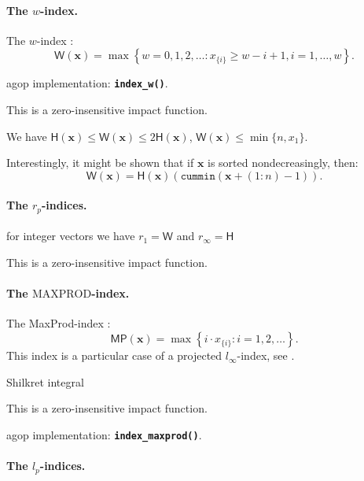 \documentclass[11pt]{article}\usepackage{graphicx, color}
\newcommand{\hlfunctioncall}[1]{\textcolor[rgb]{0.501960784313725,0,0.329411764705882}{\textbf{#1}}}%
\newcommand{\package}[1]{\textsf{#1}\xspace}
\newcommand{\Rfunc}[1]{\texttt{\hlfunctioncall{#1}}}
\newcommand{\vect}[1]{{\mathbf{#1}}}
\newcommand{\func}[1]{{\mathsf{#1}}}
\theoremstyle{remark}
\theoremstyle{definition}
\begin{document}
\paragraph{The $w$-index.}
 The $w$-index \cite{Woeginger2008:axiomatich}:
\begin{equation}\label{Eq:IndexW}
\func{W}(\vect{x}) = \max\left\{w=0,1,2,\ldots: {x}_{\{i\}} \ge w-i+1, i=1,\dots,w\right\}.
\end{equation}

\package{agop} implementation: \Rfunc{index\_w()}.

This is a zero-insensitive impact function.

We have $\func{H}(\vect{x})\le\func{W}(\vect{x})\le 2\func{H}(\vect{x})$,
$\func{W}(\vect{x})\le \min\{n, x_{1}\}$.




Interestingly, it might be shown that if $\vect{x}$ is sorted
nondecreasingly, then:
\[
\func{W}(\vect{x}) = \func{H}(\vect{x})(\mathtt{cummin}(\vect{x}+(1:n)-1)).
\]

\paragraph{The $r_p$-indices.}\cite{GagolewskiGrzegorzewski2009:geometricapproach}
for integer vectors we have $r_1=\func{W}$ and $r_\infty=\func{H}$

This is a zero-insensitive impact function.





\paragraph{The $\mathrm{MAXPROD}$-index.}
The MaxProd-index \cite{Kosmulski2007:maxprod}:
\begin{equation}\label{Eq:IndexMaxProd}
   \func{MP}(\vect{x}) = \max\left\{i\cdot{{x}}_{\{i\}}: i=1,2,\ldots\right\}.
\end{equation}
This index is a particular case of a projected $l_\infty$-index,
see \cite{GagolewskiGrzegorzewski2009:geometricapproach}.

Shilkret integral \cite{Shilkret1971:maxitivemeasure}

This is a zero-insensitive impact function.

\package{agop} implementation: \Rfunc{index\_maxprod()}.




\paragraph{The $l_p$-indices.}\cite{GagolewskiGrzegorzewski2009:geometricapproach}
\end{document}
